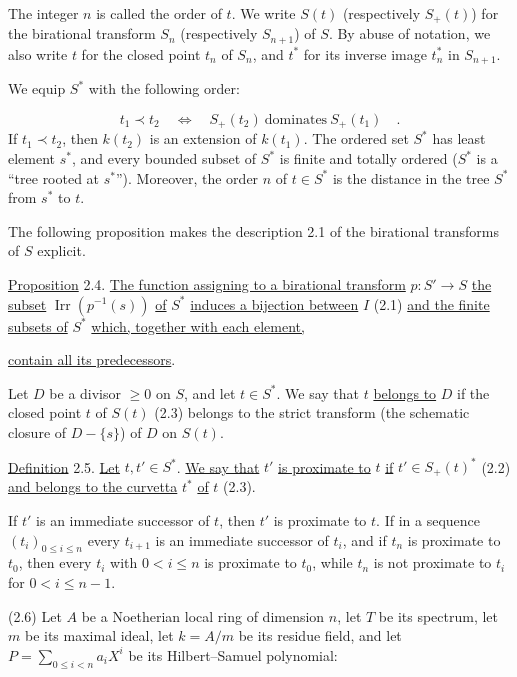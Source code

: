 The integer $n$ is called the order of $t$.  We write $S(t)$ (respectively
$S_+(t)$) for the birational transform $S_n$ (respectively $S_{n+1}$) of $S$.
By abuse of notation, we also write $t$ for the closed point $t_n$ of $S_n$, and
$t^*$ for its inverse image $t_n^*$ in $S_{n+1}$.

We equip $S^*$ with the following order:

\begin{equation*}
t_1\prec t_2
\quad\Longleftrightarrow\quad
S_+(t_2)\ \text{dominates}\ S_+(t_1) \quad .
\end{equation*}
If $t_1\prec t_2$, then $k(t_2)$ is an extension of $k(t_1)$.  The ordered set
$S^*$ has least element $s^*$, and every bounded subset of $S^*$ is finite and
totally ordered ($S^*$ is a ``tree rooted at $s^*$'').  Moreover, the order $n$ of
$t\in S^*$ is the distance in the tree $S^*$ from $s^*$ to $t$.

The following proposition makes the description 2.1 of the birational
transforms of $S$ explicit.

\underline{Proposition} 2.4. \underline{The function assigning to a birational
transform} $p:S'\to S$ \underline{the subset}
$\operatorname{Irr}(p^{-1}(s))$ \underline{of} $S^*$ \underline{induces a
bijection between} $I$ (2.1) \underline{and the finite subsets of} $S^*$
\underline{which, together with each element,}


\underline{contain all its predecessors}.

Let $D$ be a divisor $\geq0$ on $S$, and let $t\in S^*$.  We say that $t$
\underline{belongs to} $D$ if the closed point $t$ of $S(t)$ (2.3) belongs to the
strict transform (the schematic closure of $D-\{s\}$) of $D$ on $S(t)$.

\underline{Definition} 2.5. \underline{Let} $t,t'\in S^*$.
\underline{We say that} $t'$ \underline{is proximate to} $t$ \underline{if}
$t'\in S_+(t)^*$ (2.2) \underline{and belongs to the curvetta} $t^*$ \underline{of}
$t$ (2.3).

If $t'$ is an immediate successor of $t$, then $t'$ is proximate to $t$.  If in a
sequence $(t_i)_{0\leq i\leq n}$ every $t_{i+1}$ is an immediate successor of
$t_i$, and if $t_n$ is proximate to $t_0$, then every $t_i$ with $0<i\leq n$ is
proximate to $t_0$, while $t_n$ is not proximate to $t_i$ for
$0<i\leq n-1$.

(2.6) Let $A$ be a Noetherian local ring of dimension $n$, let $T$ be its
spectrum, let $m$ be its maximal ideal, let $k=A/m$ be its residue field, and let
$P=\sum_{0\leq i<n}a_iX^i$ be its Hilbert--Samuel polynomial:


